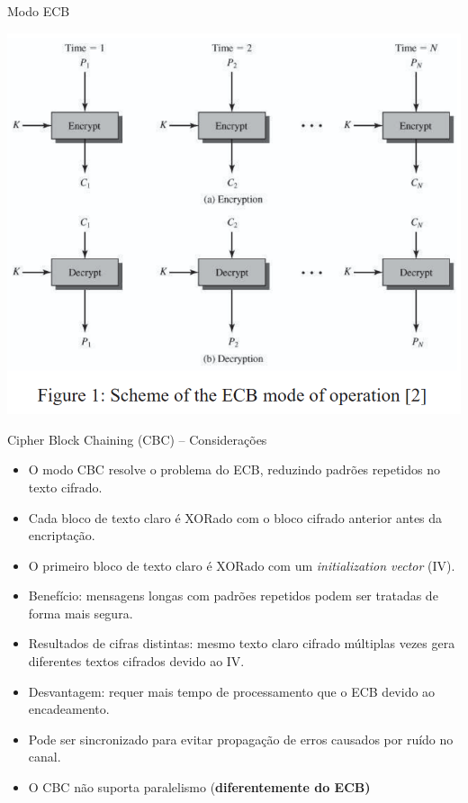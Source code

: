 \begin{frame}{Modo ECB}


\centering
    \includegraphics[width=0.6\linewidth]{Figuras/aes-modo-ecb.png}
    
\end{frame}

\begin{frame}{Cipher Block Chaining (CBC) – Considerações}
    \begin{itemize}
        \item O modo CBC resolve o problema do ECB, reduzindo padrões repetidos no texto cifrado.
        \item Cada bloco de texto claro é XORado com o bloco cifrado anterior antes da encriptação.
        \item O primeiro bloco de texto claro é XORado com um \textit{initialization vector} (IV).
        \item Benefício: mensagens longas com padrões repetidos podem ser tratadas de forma mais segura.
        \item Resultados de cifras distintas: mesmo texto claro cifrado múltiplas vezes gera diferentes textos cifrados devido ao IV.
        \item Desvantagem: requer mais tempo de processamento que o ECB devido ao encadeamento.
        \item Pode ser sincronizado para evitar propagação de erros causados por ruído no canal.
        \item O CBC não suporta paralelismo (\textbf{diferentemente do ECB)}
    \end{itemize}
\end{frame}


